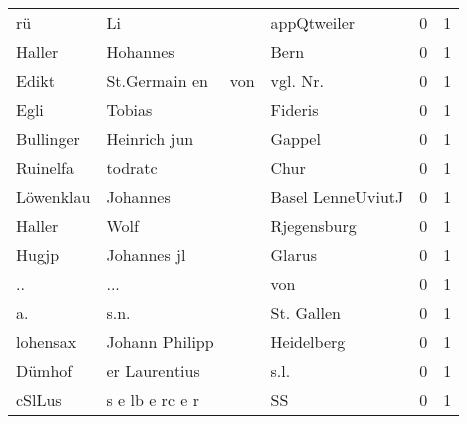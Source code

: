 \begin{tabular}{llllrr}
                       rü &                                 Li &             &                                 appQtweiler &          0 &         1 \\
                   Haller &                           Hohannes &             &                                        Bern &          0 &         1 \\
                    Edikt &                      St.Germain en &         von &                                   vgl. Nr.  &          0 &         1 \\
                     Egli &                             Tobias &             &                                     Fideris &          0 &         1 \\
                Bullinger &                       Heinrich jun &             &                                      Gappel &          0 &         1 \\
                 Ruinelfa &                            todratc &             &                                        Chur &          0 &         1 \\
                Löwenklau &                           Johannes &             &                           Basel LenneUviutJ &          0 &         1 \\
                   Haller &                               Wolf &             &                                 Rjegensburg &          0 &         1 \\
                    Hugjp &                        Johannes jl &             &                                      Glarus &          0 &         1 \\
                       .. &                                ... &             &                                         von &          0 &         1 \\
                       a. &                               s.n. &             &                                  St. Gallen &          0 &         1 \\
                 lohensax &                     Johann Philipp &             &                                  Heidelberg &          0 &         1 \\
                   Dümhof &                      er Laurentius &             &                                        s.l. &          0 &         1 \\
                   cSlLus &                    s e lb e rc e r &             &                                          SS &          0 &         1 \\

\end{tabular}
